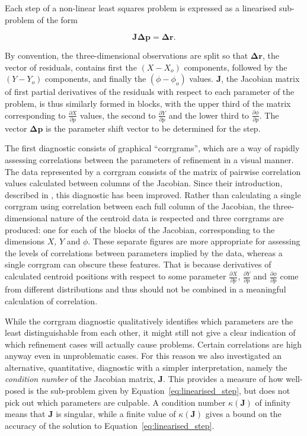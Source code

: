 \documentclass[preprint]{iucr}
\renewcommand{\vec}[1]{\mathbf{#1}}
\newcommand{\mat}[1]{\mathbf{#1}}
\newcommand{\pder}[2][]{\frac{\partial#1}{\partial#2}}
\begin{document}
Each step of a non-linear least squares problem is expressed as a linearised
sub-problem of the form

\begin{equation}
  \label{eq:linearised_step}
  \mat{J} \vec{\Delta p} = \vec{\Delta r}.
\end{equation}

By convention, the three-dimensional observations are split so that
$\vec{\Delta r}$, the vector of residuals, contains first the $(X - X_o)$
components, followed by the $(Y - Y_o)$ components, and finally the $(\phi -
\phi_o)$ values. $\mat{J}$, the Jacobian matrix of first partial derivatives of
the residuals with respect to each parameter of the problem, is thus similarly
formed in blocks, with the upper third of the matrix corresponding to
$\pder[X]{p}$ values, the second to $\pder[Y]{p}$ and the lower third to
$\pder[\phi]{p}$. The vector $\vec{\Delta p}$ is the parameter shift vector to
be determined for the step.

The first diagnostic consists of graphical ``corrgrams'', which are a way of
rapidly assessing correlations between the parameters of refinement in a visual
manner. The data represented by a corrgram consists of the matrix of pairwise
correlation values calculated between columns of the Jacobian. Since their
introduction, described in , this diagnostic has been
improved. Rather than calculating a single corrgram using correlation between
each full column of the Jacobian, the three-dimensional nature of the centroid
data is respected and three corrgrams are produced: one for each of the blocks
of the Jacobian, corresponding to the dimensions $X$, $Y$ and $\phi$. These
separate figures are more appropriate for assessing the levels of correlations
between parameters implied by the data, whereas a single corrgram can obscure
these features. That is because derivatives of calculated centroid positions
with respect to some parameter $\pder[X]{p}$, $\pder[Y]{p}$ and
$\pder[\phi]{p}$ come from different distributions and thus should not be
combined in a meaningful calculation of correlation.

While the corrgram diagnostic qualitatively identifies which parameters are the
least distinguishable from each other, it might still not give a clear
indication of which refinement cases will actually cause problems. Certain
correlations are high anyway even in unproblematic cases. For this reason we
also investigated an alternative, quantitative, diagnostic with a simpler
interpretation, namely the \emph{condition number} of the Jacobian matrix,
$\mat{J}$. This provides a measure of how well-posed is the sub-problem given
by Equation~\ref{eq:linearised_step}, but does not pick out which parameters
are culpable. A condition number $\kappa \left( \mat{J} \right)$ of infinity
means that $\mat{J}$ is singular, while a finite value of $\kappa \left(
\mat{J} \right)$ gives a bound on the accuracy of the solution to
Equation~\ref{eq:linearised_step}.
\end{document}
